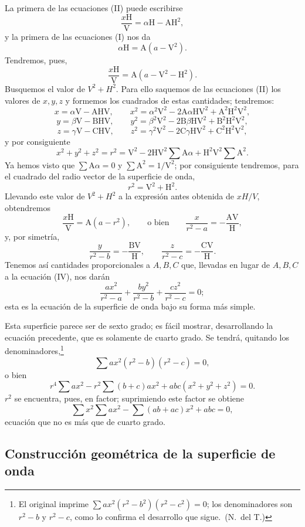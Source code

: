 La primera de las ecuaciones (II) puede escribirse
\[
\frac{x\mathrm H}{\mathrm V}=\alpha\mathrm H-\mathrm{AH}^2,
\]
y la primera de las ecuaciones (I) nos da
\[
\alpha\mathrm H=\mathrm A(a-\mathrm V^2).
\]
Tendremos, pues,
\[
\frac{x\mathrm H}{\mathrm V}=\mathrm A(a-\mathrm V^2-\mathrm H^2).
\]
Busquemos el valor de $V^2+H^2$. Para ello saquemos de las ecuaciones
(II) los valores de $x,y,z$ y formemos los cuadrados de estas cantidades;
tendremos:
\[
x=\alpha\mathrm V-\mathrm{AHV},\qquad x^2=\alpha^2\mathrm V^2-2\mathrm A\alpha\mathrm{HV}^2+\mathrm A^2\mathrm H^2\mathrm V^2,
\]
\[
y=\beta\mathrm V-\mathrm{BHV},\qquad y^2=\beta^2\mathrm V^2-2\mathrm B\beta\mathrm{HV}^2+\mathrm B^2\mathrm H^2\mathrm V^2,
\]
\[
z=\gamma\mathrm V-\mathrm{CHV},\qquad z^2=\gamma^2\mathrm V^2-2\mathrm C\gamma\mathrm{HV}^2+\mathrm C^2\mathrm H^2\mathrm V^2,
\]
y por consiguiente
\[
x^2+y^2+z^2=r^2=\mathrm V^2-2\mathrm{HV}^2\sum\mathrm A\alpha+\mathrm H^2\mathrm V^2\sum\mathrm A^2.
\]
Ya hemos visto que $\sum\mathrm A\alpha=0$ y $\sum\mathrm A^2=1/\mathrm
V^2$; por consiguiente tendremos, para el cuadrado del radio vector de la
superficie de onda,
\[
r^2=\mathrm V^2+\mathrm H^2.
\]
Llevando este valor de $V^2+H^2$ a la expresión antes obtenida de
$xH/V$, obtendremos
\[
\frac{x\mathrm H}{\mathrm V}=\mathrm A(a-r^2),\qquad\text{o bien}\qquad
\frac{x}{r^2-a}=-\frac{\mathrm{AV}}{\mathrm H},
\]
y, por simetría,
\[
\frac{y}{r^2-b}=-\frac{\mathrm{BV}}{\mathrm H},\qquad
\frac{z}{r^2-c}=-\frac{\mathrm{CV}}{\mathrm H}.
\]
Tenemos así cantidades proporcionales a $A,B,C$ que, llevadas en lugar de
$A,B,C$ a la ecuación (IV), nos darán
\[
\frac{ax^2}{r^2-a}+\frac{by^2}{r^2-b}+\frac{cz^2}{r^2-c}=0;
\]
esta es la ecuación de la superficie de onda bajo su forma más simple.

Esta superficie parece ser de sexto grado; es fácil mostrar, desarrollando
la ecuación precedente, que es solamente de cuarto grado. Se tendrá,
quitando los denominadores,\footnote{El original imprime
$\sum ax^2(r^2-b^2)(r^2-c^2)=0$; los denominadores son $r^2-b$ y $r^2-c$,
como lo confirma el desarrollo que sigue.~(N.~del T.)}
\[
\sum ax^2(r^2-b)(r^2-c)=0,
\]
o bien
\[
r^4\sum ax^2-r^2\sum(b+c)ax^2+abc(x^2+y^2+z^2)=0.
\]
$r^2$ se encuentra, pues, en factor; suprimiendo este factor se obtiene
\[
\sum x^2\sum ax^2-\sum(ab+ac)x^2+abc=0,
\]
ecuación que no es más que de cuarto grado.

\subsection{Construcción geométrica de la superficie de onda}

